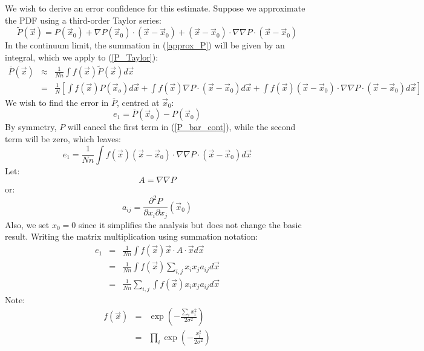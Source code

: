 \documentclass[11pt]{article}
\begin{document}
We wish to derive an error confidence for this estimate.
Suppose we approximate the PDF using a third-order Taylor series:
\begin{equation}
  \tilde P(\vec x) = P(\vec x_0) + \nabla P(\vec x_0) \cdot (\vec x-\vec x_0)
	+(\vec x-\vec x_0) \cdot \nabla \nabla P \cdot (\vec x - \vec x_0)
  \label{P_Taylor}
\end{equation}
In the continuum limit, the summation in (\ref{approx_P}) 
will be given by an integral, which we apply to (\ref{P_Taylor}):
\begin{eqnarray}
  \overline P(\vec x) & \approx & \frac{1}{Nn}\int f(\vec x) \tilde P(\vec x) d \vec x\\
   & = & \frac{1}{N} \left [ \int f(\vec x) P(\vec x_o)d\vec x + 
		\int f(\vec x) \nabla P \cdot (\vec x-\vec x_0) d\vec x +
		\int f(\vec x) (\vec x-\vec x_0) \cdot \nabla \nabla P \cdot
		(\vec x - \vec x_0) d\vec x \right ]
  \label{P_bar_cont}
\end{eqnarray}
We wish to find the error in $\overline P$, centred at $\vec x_0$:
\begin{equation}
e_1 = \overline P(\vec x_0) - P(\vec x_0)
\end{equation}
By symmetry, $P$ will cancel the first term in (\ref{P_bar_cont}), while the
second term will be zero, which leaves:
\begin{equation}
  e_1 = \frac{1}{Nn} \int f(\vec x)(\vec x-\vec x_0) \cdot \nabla \nabla P \cdot (\vec x-\vec x_0) d\vec x
\end{equation}
Let:
\begin{equation}
A = \nabla \nabla P
\end{equation}
or:
\begin{equation}
a_{ij} = \frac{\partial^2 P}{\partial x_i \partial x_j} (\vec x_0)
\end{equation}
Also, we set $x_0=0$ since it simplifies the analysis but does not change
the basic result.  Writing the matrix multiplication using summation notation:
\begin{eqnarray}
  e_1 & = & \frac{1}{Nn} \int f(\vec x) \vec x \cdot A \cdot \vec x d\vec x \\
	& = & \frac{1}{Nn} \int f(\vec x) \sum_{i, j} x_i x_j a_{ij} d\vec x \\
	& = & \frac{1}{Nn} \sum_{i, j} \int f(\vec x) x_i x_j a_{ij} d\vec x
\end{eqnarray}
Note:
\begin{eqnarray}
  f(\vec x) & = & \exp \left ( -\frac{\sum_i x_i^2}{2 \sigma^2} \right ) \\
	& = & \prod_i \exp \left ( -\frac{x_i^2}{2 \sigma^2} \right )
\end{eqnarray}
\end{document}
